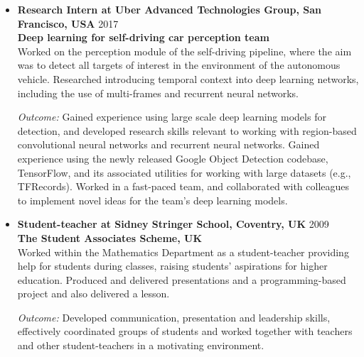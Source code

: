 \documentclass[10pt,letterpaper]{article}
\newcommand{\thing}[2]{{#1} \hfill {#2}}
\begin{document}
\begin{itemize}%

\item \thing{\bf Research Intern at Uber Advanced Technologies Group, San Francisco, USA}{2017}\\
        {\bf Deep learning for self-driving car perception team}\vspace{0.5em}\\
        Worked on the perception module of the self-driving pipeline, where the aim was to detect all targets of interest in the environment of the autonomous vehicle. Researched introducing temporal context into deep learning networks, including the use of multi-frames and recurrent neural networks.
	
	{\it Outcome:} Gained experience using large scale deep learning models for detection, and developed research skills relevant to working with region-based convolutional neural networks and recurrent neural networks. Gained experience using the newly released Google Object Detection codebase, TensorFlow, and its associated utilities for working with large datasets (e.g., TFRecords). Worked in a fast-paced team, and collaborated with colleagues to implement novel ideas for the team's deep learning models.
		
\item \thing{\bf Student-teacher at Sidney Stringer School, Coventry, UK}{2009}\\
        {\bf The Student Associates Scheme, UK}\vspace{0.5em}\\
	Worked within the Mathematics Department as a student-teacher providing help for students during classes, raising students' aspirations for higher education. Produced and delivered presentations and a programming-based project and also delivered a lesson. 
	
	{\it Outcome:} Developed communication, presentation and leadership skills, effectively coordinated groups of students and worked together with teachers and other student-teachers in a motivating environment.

%	

\end{itemize}
\end{document}

